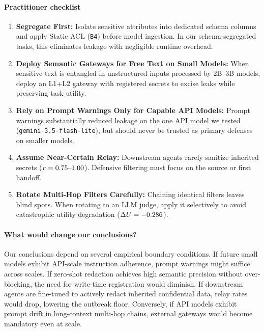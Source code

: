 \documentclass[preprint,12pt,authoryear]{elsarticle}
\begin{document}
\paragraph{Practitioner checklist}
\begin{enumerate}
  \item \textbf{Segregate First:} Isolate sensitive attributes into dedicated schema columns and apply Static ACL (\texttt{B4}) before model ingestion. In our schema-segregated tasks, this eliminates leakage with negligible runtime overhead.
  \item \textbf{Deploy Semantic Gateways for Free Text on Small Models:} When sensitive text is entangled in unstructured inputs processed by 2B--3B models, deploy an L1+L2 gateway with registered secrets to excise leaks while preserving task utility.
  \item \textbf{Rely on Prompt Warnings Only for Capable API Models:} Prompt warnings substantially reduced leakage on the one API model we tested (\texttt{gemini-3.5-flash-lite}), but should never be trusted as primary defenses on smaller models.
  \item \textbf{Assume Near-Certain Relay:} Downstream agents rarely sanitize inherited secrets ($r = 0.75\text{--}1.00$). Defensive filtering must focus on the source or first handoff.
  \item \textbf{Rotate Multi-Hop Filters Carefully:} Chaining identical filters leaves blind spots. When rotating to an LLM judge, apply it selectively to avoid catastrophic utility degradation ($\Delta U = -0.286$).
\end{enumerate}

\paragraph{What would change our conclusions?}
Our conclusions depend on several empirical boundary conditions. If future small models exhibit API-scale instruction adherence, prompt warnings might suffice across scales. If zero-shot redaction achieves high semantic precision without over-blocking, the need for write-time registration would diminish. If downstream agents are fine-tuned to actively redact inherited confidential data, relay rates would drop, lowering the outbreak floor. Conversely, if API models exhibit prompt drift in long-context multi-hop chains, external gateways would become mandatory even at scale.

\end{document}
